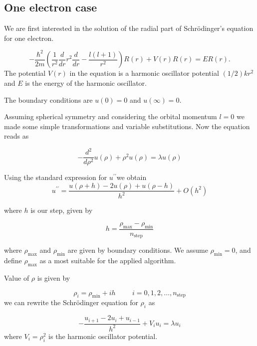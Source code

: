 \documentclass[10pt]{article}
\begin{document}
\subsection{One electron case}
We are first interested in the solution of the radial part of Schr\"{o}dinger's equation for one electron. 

\begin{equation*}
  -\frac{\hbar^2}{2 m} \left ( \frac{1}{r^2} \frac{d}{dr} r^2
  \frac{d}{dr} - \frac{l (l + 1)}{r^2} \right )R(r) 
     + V(r) R(r) = E R(r).
\end{equation*}
The potential $V(r)$  in the equation is a harmonic oscillator potential $(1/2)kr^2$ and $E$ is the energy of the harmonic oscillator. 

The boundary conditions are $u(0)=0$ and $u(\infty)=0$.

Assuming spherical symmetry and considering the orbital momentum $l=0$ we made some simple transformations and variable substitutions. Now the equation reads as


\begin{equation}
-\frac{d^{2}}{d\rho ^{2}}u(\rho )+\rho ^{2}u(\rho )=\lambda u(\rho )
\end{equation}

Using the standard expression for $u^{\prime \prime }$we obtain 
\begin{equation}
u^{\prime \prime }=\frac{u(\rho +h)-2u(\rho )+u(\rho -h)}{h^{2}}+O(h^{2})
\end{equation}

where $h$ is our step, given by

\begin{equation}
h=\frac{\rho _{\mathrm{max}}-\rho _{\mathrm{min}}}{n_{\mathrm{step}}}
\end{equation}

where $\rho _{\mathrm{max}}$ and $\rho _{\mathrm{min}}$ are given by boundary conditions. We assume $\rho _{\mathrm{min}}=0$, and define $\rho_{\mathrm{max}}$ as a most suitable for the applied algorithm.

Value of $\rho $ is given by

\begin{equation}
\rho _{i}=\rho _{\mathrm{min}}+ih\hspace{1cm}i=0,1,2,\dots ,n_{\mathrm{step}}
\end{equation}
we can rewrite the Schr\"{o}dinger equation for $\rho _{i}$ as

\begin{equation}
-\frac{u_{i+1}-2u_{i}+u_{i-1}}{h^{2}}+V_{i}u_{i}=\lambda u_{i}
\end{equation}
where $V_{i}=\rho _{i}^{2}$ is the harmonic oscillator potential. 
\end{document}
